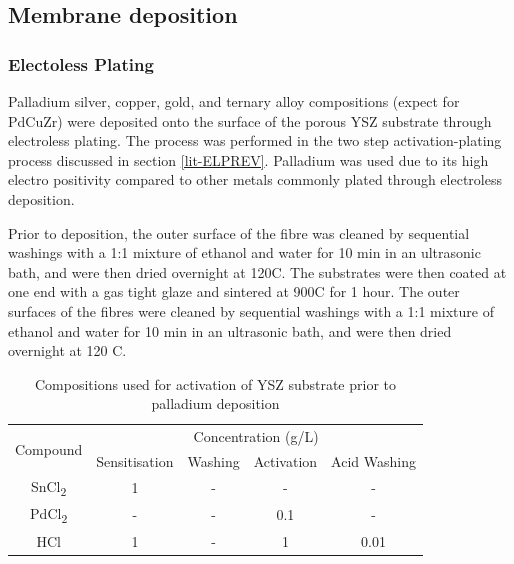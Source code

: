 \subsection{Membrane deposition}
\subsubsection{Electoless Plating}\label{elpproc}
Palladium silver, copper, gold, and ternary alloy compositions (expect for PdCuZr) were deposited onto the surface of the porous YSZ substrate through electroless plating. The process was performed in the two step activation-plating process discussed in section \ref{lit-ELPREV}. Palladium was used due to its high electro positivity compared to other metals commonly plated through electroless deposition. 

Prior to deposition, the outer surface of the fibre was cleaned by sequential washings with a 1:1 mixture of ethanol and water for 10 min in an ultrasonic bath, and were then dried overnight at 120\textdegree C. The substrates were then coated at one end with a gas tight glaze and sintered at 900\textdegree C for 1 hour. The outer surfaces of the fibres were cleaned by sequential washings with a 1:1 mixture of ethanol and water for 10 min in an ultrasonic bath, and were then dried overnight at 120 \textdegree C.

\begin{table}[]
  \centering
  \caption{Compositions used for activation of YSZ substrate prior to palladium deposition}
  \label{pretreat}
  \begin{tabular}{@{}ccccc@{}}
  \toprule
  \multicolumn{1}{l}{\multirow{2}{*}{Compound}} & \multicolumn{4}{c}{Concentration (g/L)}             \\ \cmidrule(l){2-5} 
  \multicolumn{1}{l}{}                          & Sensitisation & Washing & Activation & Acid Washing \\ \midrule
  SnCl\textsubscript{2}                                         & 1             & -       & -          & -            \\
  PdCl\textsubscript{2}                                         & -             & -       & 0.1        & -            \\
  HCl                                           & 1             & -       & 1          & 0.01           \\ \bottomrule
  \end{tabular}
  \end{table}


